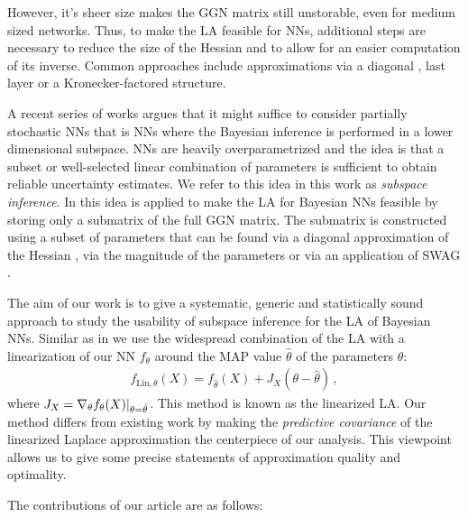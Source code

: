 However, it's sheer size makes the GGN matrix still unstorable, even for medium sized networks. 
Thus, to make the LA feasible for NNs, additional steps are necessary to reduce the size of the Hessian and to allow for an easier computation of its inverse. Common approaches include approximations via a diagonal \cite{lecun1989optimal,Salimans2016,kirkpatrick2017overcoming}, last layer \cite{kristiadi2020} or a Kronecker-factored \cite{Ritter2018} structure.

A recent series of works argues that it might suffice to consider partially stochastic NNs \cite{kristiadi2020,Snoek2015,Izmailov2019,Daxberger2021,Sharma2023} that is NNs where the Bayesian inference is performed in a lower dimensional subspace. NNs are heavily overparametrized and the idea is that a subset or well-selected linear combination of parameters is sufficient to obtain reliable uncertainty estimates. 
We refer to this idea in this work as \emph{subspace inference}. In \cite{Daxberger2021} this idea is applied to make the LA for Bayesian NNs feasible by storing only a submatrix of the full GGN matrix. The submatrix is constructed using a subset of parameters that can be found via a diagonal approximation of the Hessian \cite{Daxberger2021}, via the magnitude of the parameters \cite{Cheng2017} or via an application of SWAG \cite{maddox2019simple}. 

The aim of our work is to give a systematic, generic and statistically sound approach to study the usability of subspace inference for the LA of Bayesian NNs.
Similar as in \cite{Daxberger2021} we use the widespread \cite{Foong2019,Immer2021,Deng2022,Ortega2023}  combination of the LA with a linearization of our NN $f_\theta$ around the MAP value $\hat{\theta}$ of the parameters $\theta$:
\begin{align}
   \label{eq:intro_lin_model}
   f_{\mathrm{Lin},\theta}(X) = f_{\hat{\theta}}(X) + J_X (\theta-\hat{\theta})\,,
\end{align}
where $J_X = \nabla_\theta f_\theta(X)\vert_{\theta=\hat{\theta}}$. This method is known as the linearized LA. Our method differs from existing work by making the \emph{predictive covariance} of the linearized Laplace approximation the centerpiece of our analysis.
This viewpoint allows us to give some precise statements of approximation quality and optimality.

The contributions of our article are as follows:

